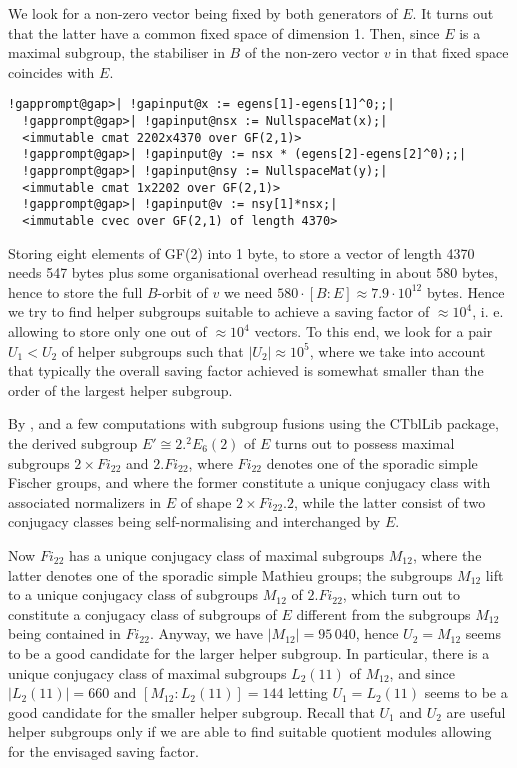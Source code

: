 \documentclass[a4paper,11pt]{report}
\begin{document}
{{ We look for a non-zero vector being fixed by both generators of $E$. It turns out that the latter have a common fixed space of dimension 1. Then,
since $E$ is a maximal subgroup, the stabiliser in $B$ of the non-zero vector $v$ in that fixed space coincides with $E$. 
\begin{Verbatim}[commandchars=!@|,fontsize=\small,frame=single,label=Example]
  !gapprompt@gap>| !gapinput@x := egens[1]-egens[1]^0;;|
  !gapprompt@gap>| !gapinput@nsx := NullspaceMat(x);|
  <immutable cmat 2202x4370 over GF(2,1)>
  !gapprompt@gap>| !gapinput@y := nsx * (egens[2]-egens[2]^0);;|
  !gapprompt@gap>| !gapinput@nsy := NullspaceMat(y);|
  <immutable cmat 1x2202 over GF(2,1)>
  !gapprompt@gap>| !gapinput@v := nsy[1]*nsx;|
  <immutable cvec over GF(2,1) of length 4370> 
\end{Verbatim}
 

 Storing eight elements of GF(2) into 1 byte, to store a vector of length 4370
needs 547 bytes plus some organisational overhead resulting in about 580
bytes, hence to store the full $B$-orbit of $v$ we need $580 \cdot [B\colon E] \approx 7.9 \cdot 10^{12}$ bytes. Hence we try to find helper subgroups suitable to achieve a saving
factor of $\approx 10^4$, i. e. allowing to store only one out of $\approx 10^4$ vectors. To this end, we look for a pair $U_1<U_2$ of helper subgroups such that $|U_2| \approx 10^5$, where we take into account that typically the overall saving factor achieved
is somewhat smaller than the order of the largest helper subgroup.  

 By \cite{CCN85}, and a few computations with subgroup fusions using the \textsf{CTblLib} package, the derived subgroup $E' \cong 2.{}^2E_6(2)$ of $E$ turns out to possess maximal subgroups $2 \times Fi_{{22}}$ and $2.Fi_{{22}}$, where $Fi_{{22}}$ denotes one of the sporadic simple Fischer groups, and where the former
constitute a unique conjugacy class with associated normalizers in $E$ of shape $2 \times Fi_{{22}}.2$, while the latter consist of two conjugacy classes being self-normalising and
interchanged by $E$. 

 Now $Fi_{{22}}$ has a unique conjugacy class of maximal subgroups $M_{{12}}$, where the latter denotes one of the sporadic simple Mathieu groups; the
subgroups $M_{{12}}$ lift to a unique conjugacy class of subgroups $M_{{12}}$ of $2.Fi_{{22}}$, which turn out to constitute a conjugacy class of subgroups of $E$ different from the subgroups $M_{{12}}$ being contained in $Fi_{{22}}$. Anyway, we have $|M_{{12}}|=95\,040$, hence $U_2=M_{{12}}$ seems to be a good candidate for the larger helper subgroup. In particular,
there is a unique conjugacy class of maximal subgroups $L_2(11)$ of $M_{{12}}$, and since $|L_2(11)|=660$ and $[M_{{12}}\colon L_2(11)]=144$ letting $U_1=L_2(11)$ seems to be a good candidate for the smaller helper subgroup. Recall that $U_1$ and $U_2$ are useful helper subgroups only if we are able to find suitable quotient
modules allowing for the envisaged saving factor. 

}}
\end{document}
